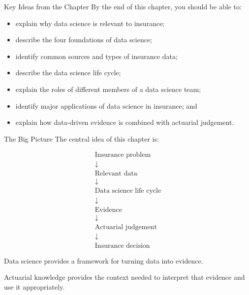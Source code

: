\documentclass[
  ignorenonframetext,
  aspectratio=169,
]{beamer}
\providecommand{\tightlist}{%
  \setlength{\itemsep}{0pt}\setlength{\parskip}{0pt}}
\begin{document}
\begin{frame}{Key Ideas from the Chapter}
\protect{}\label{key-ideas-from-the-chapter}
By the end of this chapter, you should be able to:

\begin{itemize}
\tightlist
\item
  explain why data science is relevant to insurance;
\item
  describe the four foundations of data science;
\item
  identify common sources and types of insurance data;
\item
  describe the data science life cycle;
\item
  explain the roles of different members of a data science team;
\item
  identify major applications of data science in insurance; and
\item
  explain how data-driven evidence is combined with actuarial judgement.
\end{itemize}
\end{frame}

\begin{frame}{The Big Picture}
\protect{}\label{the-big-picture}
The central idea of this chapter is:

\[
\boxed{
\begin{array}{c}
\text{Insurance problem}
\\[4pt]
\downarrow
\\[4pt]
\text{Relevant data}
\\[4pt]
\downarrow
\\[4pt]
\text{Data science life cycle}
\\[4pt]
\downarrow
\\[4pt]
\text{Evidence}
\\[4pt]
\downarrow
\\[4pt]
\text{Actuarial judgement}
\\[4pt]
\downarrow
\\[4pt]
\text{Insurance decision}
\end{array}
}
\]

Data science provides a framework for turning data into evidence.

Actuarial knowledge provides the context needed to interpret that
evidence and use it appropriately.
\end{frame}
\end{document}
